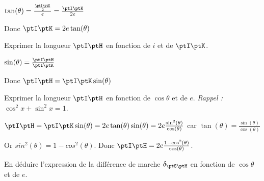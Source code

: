 
\begin{corrige}
	$\tan(\theta)=\frac{\frac{\ptI \ptK}{2}}{e}=\frac{\ptI \ptK}{2e}$

	Donc $\ptI \ptK=2e\tan(\theta)$
\end{corrige}




\begin{enonce}
Exprimer la longueur $\ptI \ptH$ en fonction de $i$ et de $\ptI \ptK$.
\end{enonce}

\reponse{$\ptI \ptK \sin(\theta)$}
	
\begin{corrige}
	$\sin(\theta)=\frac{\ptI \ptH}{\ptI \ptK}$

	Donc $\ptI \ptH=\ptI \ptK \sin(\theta)$
\end{corrige}



\begin{enonce}
Exprimer la longueur $\ptI \ptH$ en fonction de $\cos\theta$ et de $e$. \textit{Rappel :} $\cos^2 x+\sin^2 x =1$.
\end{enonce}
	
	
\begin{corrige}
	$\ptI \ptH=\ptI \ptK \sin(\theta)=2e\tan(\theta)\sin(\theta)=2e\frac{\sin^2(\theta)}{\cos(\theta)}$ car $\tan(\theta)=\frac{\sin(\theta)}{\cos(\theta)}$

	Or $sin^2(\theta)=1-cos^2(\theta)$. Donc $\ptI \ptH=2e \frac{1-\cos^2(\theta)}{\cos(\theta)}$.
\end{corrige}
	


\begin{enonce}
En déduire l'expression de la différence de marche $\delta_{\ptS \ptM}$ en fonction de $\cos\theta$ et de $e$.
\end{enonce}
		
